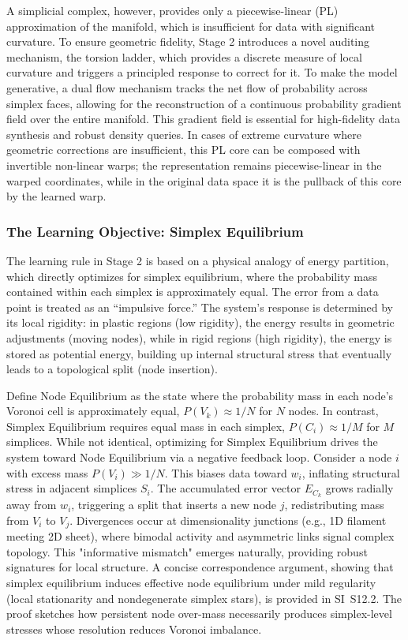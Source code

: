 \documentclass[11pt]{article}
\begin{document}
A simplicial complex, however, provides only a piecewise-linear (PL) approximation of the manifold, which is insufficient for data with significant curvature. To ensure geometric fidelity, Stage 2 introduces a novel auditing mechanism, the torsion ladder, which provides a discrete measure of local curvature and triggers a principled response to correct for it. To make the model generative, a dual flow mechanism tracks the net flow of probability across simplex faces, allowing for the reconstruction of a continuous probability gradient field over the entire manifold. This gradient field is essential for high-fidelity data synthesis and robust density queries. In cases of extreme curvature where geometric corrections are insufficient, this PL core can be composed with invertible non-linear warps; the representation remains piecewise-linear in the warped coordinates, while in the original data space it is the pullback of this core by the learned warp.

\subsubsection{The Learning Objective: Simplex Equilibrium}
The learning rule in Stage 2 is based on a physical analogy of energy partition, which directly optimizes for simplex equilibrium, where the probability mass contained within each simplex is approximately equal. The error from a data point is treated as an ``impulsive force.'' The system's response is determined by its local rigidity: in plastic regions (low rigidity), the energy results in geometric adjustments (moving nodes), while in rigid regions (high rigidity), the energy is stored as potential energy, building up internal structural stress that eventually leads to a topological split (node insertion).

Define Node Equilibrium as the state where the probability mass in each node's Voronoi cell is approximately equal, $P(V_k) \approx 1/N$ for $N$ nodes. In contrast, Simplex Equilibrium requires equal mass in each simplex, $P(C_i) \approx 1/M$ for $M$ simplices. While not identical, optimizing for Simplex Equilibrium drives the system toward Node Equilibrium via a negative feedback loop. Consider a node $i$ with excess mass $P(V_i) \gg 1/N$. This biases data toward $w_i$, inflating structural stress in adjacent simplices $S_i$. The accumulated error vector $E_{C_k}$ grows radially away from $w_i$, triggering a split that inserts a new node $j$, redistributing mass from $V_i$ to $V_j$. Divergences occur at dimensionality junctions (e.g., 1D filament meeting 2D sheet), where bimodal activity and asymmetric links signal complex topology. This "informative mismatch" emerges naturally, providing robust signatures for local structure. A concise correspondence argument, showing that simplex equilibrium induces effective node equilibrium under mild regularity (local stationarity and nondegenerate simplex stars), is provided in SI~S12.2. The proof sketches how persistent node over-mass necessarily produces simplex-level stresses whose resolution reduces Voronoi imbalance.
\end{document}
